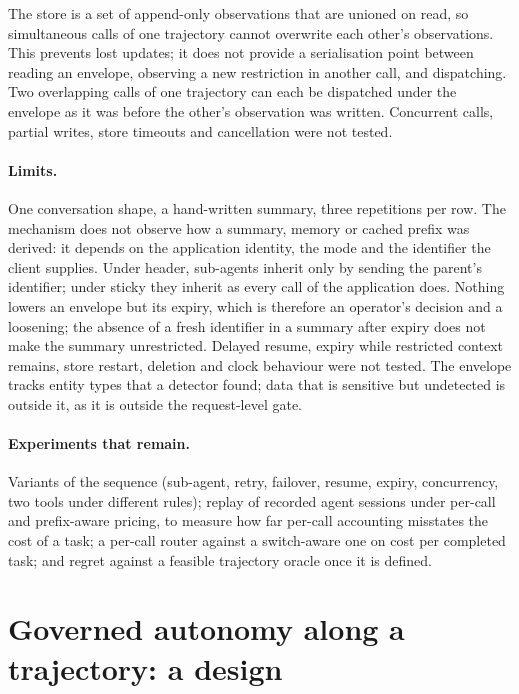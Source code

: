 \documentclass[11pt]{article}
\newcommand{\ubreak}{\textunderscore\allowbreak}
\newcommand{\code}[1]{{\ttfamily\let\_\ubreak #1}}
\begin{document}
The store is a set of append-only observations that are unioned on read, so simultaneous calls
of one trajectory cannot overwrite each other's observations. This prevents lost updates; it
does not provide a serialisation point between reading an envelope, observing a new restriction
in another call, and dispatching. Two overlapping calls of one trajectory can each be
dispatched under the envelope as it was before the other's observation was written. Concurrent
calls, partial writes, store timeouts and cancellation were not tested.

\paragraph{Limits.} One conversation shape, a hand-written summary, three repetitions per row.
The mechanism does not observe how a summary, memory or cached prefix was derived: it depends on
the application identity, the mode and the identifier the client supplies. Under \code{header},
sub-agents inherit only by sending the parent's identifier; under \code{sticky} they inherit as
every call of the application does. Nothing lowers an envelope but its expiry, which is
therefore an operator's decision and a loosening; the absence of a fresh identifier in a summary
after expiry does not make the summary unrestricted. Delayed resume, expiry while restricted
context remains, store restart, deletion and clock behaviour were not tested. The envelope
tracks entity types that a detector found; data that is sensitive but undetected is outside it,
as it is outside the request-level gate.

\paragraph{Experiments that remain.} Variants of the sequence (sub-agent, retry, failover,
resume, expiry, concurrency, two tools under different rules); replay of recorded agent sessions
under per-call and prefix-aware pricing, to measure how far per-call accounting misstates the
cost of a task; a per-call router against a switch-aware one on cost per completed task; and
regret against a feasible trajectory oracle once it is defined.

\section{Governed autonomy along a trajectory: a design}
\label{sec:smart}
\end{document}
